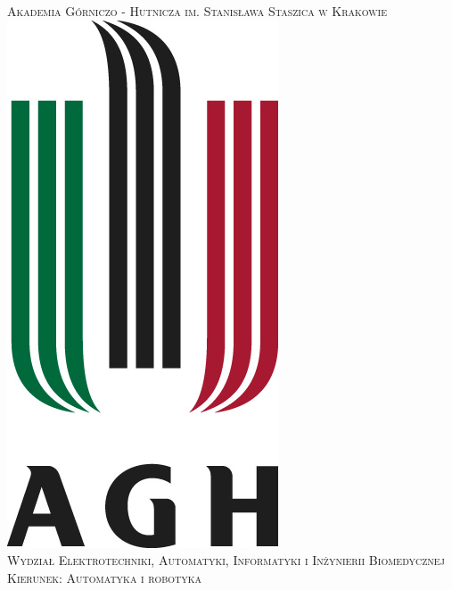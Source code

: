 \begin{titlepage}

\newcommand{\HRule}{\rule{\linewidth}{0.5mm}} %

\center %
 

\textsc{\LARGE Akademia Górniczo - Hutnicza im. Stanisława Staszica w Krakowie}\\[0.5cm]
\includegraphics[scale=0.6]{agh}\\[1cm] %
\textsc{\Large Wydział Elektrotechniki, Automatyki, Informatyki i Inżynierii Biomedycznej}\\[0.5cm] %
\textsc{\large Kierunek: Automatyka i robotyka}\\[0.5cm] %



\end{titlepage}
